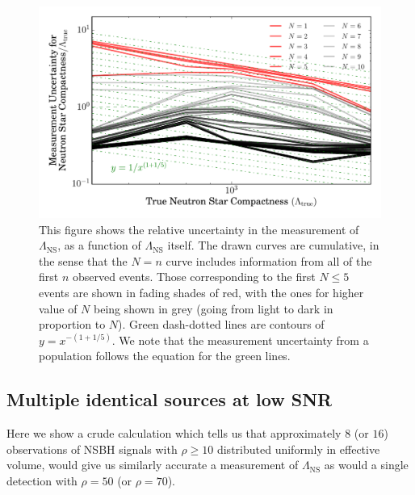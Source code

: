 \documentclass[aps,prd,amsmath,floats,floatfix, twocolumn,
superscriptaddress,nofootinbib,showpacs]{revtex4-1}
\newcommand{\prayush}{\textcolor{red!40!black}}
\newcommand{\lambdans}{\Lambda_\mathrm{NS}}
\begin{document}
%

% 
\begin{figure}
\centering    
\includegraphics[width=1.\columnwidth]{plots/LambdalErrorBars_vs_Lambda_N49_Log.pdf}
\caption{This figure shows the relative uncertainty in the measurement of $\lambdans$,
as a function of $\lambdans$ itself. The drawn curves are cumulative, in the sense 
that the $N=n$ curve includes information from all of the first $n$ observed events.
Those corresponding to the first $N\leq 5$ events are shown in fading shades of red,
with the ones for higher value of $N$ being shown in grey (going from light to dark in
proportion to $N$).
Green dash-dotted lines are contours of $y=x^{-(1+1/5)}$.
% 
\prayush{We note that the measurement uncertainty from a population follows the
equation for the green lines.}
% 
}
\label{fig:TT_Lambda_vs_Lambda_L500_2000_CI90_0_AllInOne}
\end{figure}
%



% 
\subsection{Multiple identical sources at low SNR}\label{s2:identical_multiple}
% 
% 
Here we show a crude calculation which tells us that approximately $8$ (or $16$) observations
of NSBH signals with $\rho\geq 10$ distributed uniformly in effective volume, would
give us similarly accurate a measurement of $\lambdans$ as would a single detection
with $\rho=50$ (or $\rho=70$). 
\end{document}
